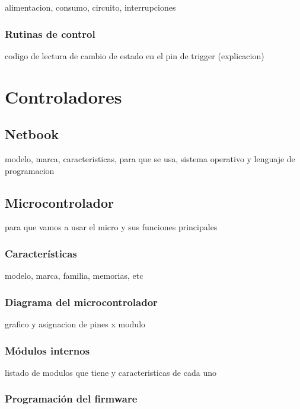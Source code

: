 alimentacion, consumo, circuito, interrupciones

\subsubsection{Rutinas de control}
\label{h_sensado_pulsador_rutinas}

codigo de lectura de cambio de estado en el pin de trigger (explicacion)

\section{Controladores}
\label{h_controlador}

\subsection{Netbook}
\label{h_controlador_netbook}

modelo, marca, caracteristicas, para que se usa, sistema operativo y lenguaje de programacion

\subsection{Microcontrolador}
\label{h_controlador_micro}

para que vamos a usar el micro y sus funciones principales

\subsubsection{Caracter\'isticas}
\label{h_controlador_micro_caracteristicas}

modelo, marca, familia, memorias, etc

\subsubsection{Diagrama del microcontrolador}
\label{h_controlador_micro_diagrama}

grafico y asignacion de pines x modulo

\subsubsection{M\'odulos internos}
\label{h_controlador_micro_modulos}

listado de modulos que tiene y caracteristicas de cada uno

\subsubsection{Programaci\'on del firmware}
\label{h_controlador_micro_programacion}

